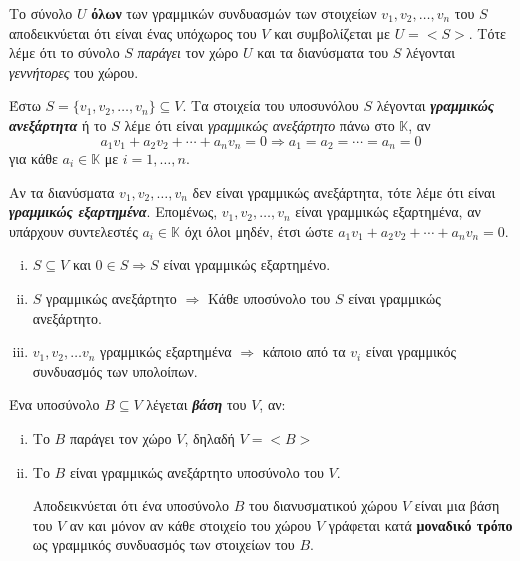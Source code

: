 Το σύνολο $U$ \textbf{όλων} των γραμμικών συνδυασμών των στοιχείων $v_1,v_2,\ldots, v_n$ του $S$ αποδεικνύεται ότι είναι ένας υπόχωρος του 
$V$ και συμβολίζεται με $U=<S>$. Τότε λέμε ότι το σύνολο $S$ \textit{παράγει} τον χώρο $U$ και τα διανύσματα του $S$ λέγονται \textit{γεννήτορες} του χώρου.

\begin{dfn} Έστω $S=\{v_1,v_2,\ldots,v_n\}\subseteq V$. Τα στοιχεία του υποσυνόλου $S$ λέγονται \textbf{\textit{γραμμικώς ανεξάρτητα}} ή το $S$ λέμε ότι είναι \textit{γραμμικώς ανεξάρτητο} πάνω στο $\mathbb{K}$, αν 
\[
a_1v_1+a_2v_2+\cdots +a_nv_n=0\Rightarrow a_1=a_2=\cdots=a_n=0
\]
για κάθε $a_i\in \mathbb{K}$ με  $i=1,\ldots,n$. 
\end{dfn}

\begin{dfn} Αν τα διανύσματα $v_1,v_2,\ldots,v_n$ δεν είναι γραμμικώς ανεξάρτητα, τότε λέμε ότι είναι \textbf{\textit{γραμμικώς εξαρτημένα}}. Επομένως, $v_1,v_2,\ldots,v_n$ είναι γραμμικώς εξαρτημένα, αν υπάρχουν  συντελεστές $a_i\in \mathbb{K}$ όχι όλοι μηδέν, έτσι ώστε $a_1v_1+a_2v_2+\cdots +a_nv_n=0$.
\end{dfn}

\begin{prop}
\begin{enumerate}[i.]
\item $S\subseteq V$ και $0\in S\Rightarrow S$ είναι γραμμικώς εξαρτημένο.
\item $S$ γραμμικώς ανεξάρτητο $\Rightarrow$ Κάθε υποσύνολο του $S$ είναι γραμμικώς ανεξάρτητο.
\item $v_1,v_2,\ldots v_n$ γραμμικώς εξαρτημένα $\Rightarrow$ κάποιο από τα $v_i$ είναι γραμμικός συνδυασμός των υπολοίπων.
\end{enumerate} 
\end{prop}

\begin{dfn} Ένα υποσύνολο $B\subseteq V$ λέγεται \textbf{\textit{βάση}} του $V$, αν:
\begin{enumerate}[i.]
\item Το $B$ παράγει τον χώρο $V$, δηλαδή $V=<B>$ 
\item Το $B$ είναι γραμμικώς ανεξάρτητο υποσύνολο του $V$.

Αποδεικνύεται ότι ένα υποσύνολο $B$ του διανυσματικού χώρου $V$ είναι μια βάση του $V$ αν και μόνον αν κάθε στοιχείο του χώρου $V$ γράφεται κατά \textbf{μοναδικό τρόπο} ως γραμμικός συνδυασμός των στοιχείων του $Β$.
\end{enumerate}
\end{dfn}

